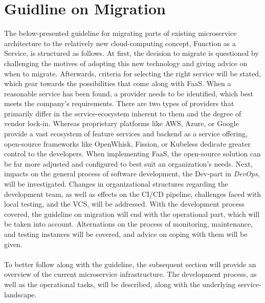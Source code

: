 \documentclass[11pt]{article}
\begin{document}
\section{Guidline on Migration}
The below-presented guideline for migrating parts of existing microservice architecture to the relatively new cloud-computing concept, Function as a Service, is structured as follows. At first, the decision to migrate is questioned by challenging the motives of adopting this new technology and giving advice on when to migrate. Afterwards, criteria for selecting the right service will be stated, which gear towards the possibilities that come along with FaaS. When a reasonable service has been found, a provider needs to be identified, which best meets the company's requirements. There are two types of providers that primarily differ in the service-ecosystem inherent to them and the degree of vendor lock-in. Whereas proprietary platforms like AWS, Azure, or Google provide a vast ecosystem of feature services and backend as a service offering, open-source frameworks like OpenWhisk, Fission, or Kubeless dedicate greater control to the developers. When implementing FaaS, the open-source solution can be far more adjusted and configured to best suit an organization's needs. Next, impacts on the general process of software development, the \glqq Dev\grqq{}-part in \textit{DevOps}, will be investigated. Changes in organizational structures regarding the development team, as well as effects on the CI/CD pipeline, challenges faced with local testing, and the VCS, will be addressed. With the development process covered, the guideline on migration will end with the operational part, which will be taken into account. Alternations on the process of monitoring, maintenance, and testing instances will be covered, and advice on coping with them will be given.\\\\ To better follow along with the guideline, the subsequent section will provide an overview of the current microservice infrastructure. The development process, as well as the operational tasks, will be described, along with the underlying service-landscape.
\end{document}
